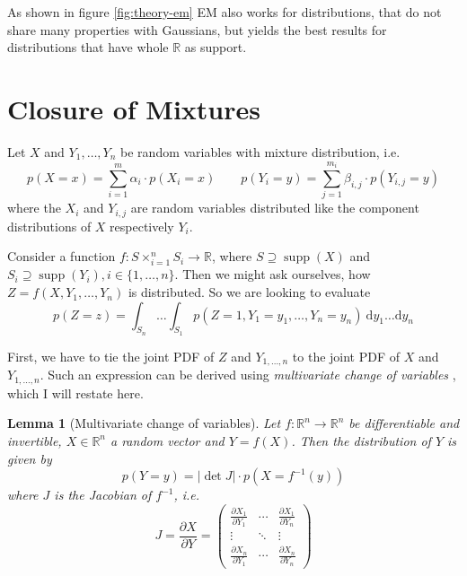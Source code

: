 \documentclass[11pt,a4paper]{book}
\newtheorem{lemma}{Lemma}
\DeclareMathOperator{\supp}{supp}
\begin{document}
As shown in figure \ref{fig:theory-em} EM also works for distributions, that do
not share many properties with Gaussians, but yields the best results for
distributions that have whole $\mathbb{R}$ as support.

\section{Closure of Mixtures}
\label{sec:closure}

Let $X$ and $Y_{1}, \dots, Y_{n}$ be random variables with mixture distribution,
i.e.
\begin{equation*}
  p(X = x) = \sum_{i = 1}^{m} \alpha_{i} \cdot p(X_{i} = x) \qquad p(Y_{i} = y) = \sum_{j = 1}^{m_{i}} \beta_{i,j} \cdot p(Y_{i,j} = y)
\end{equation*}
where the $X_{i}$ and $Y_{i, j}$ are random variables distributed like the
component distributions of $X$ respectively $Y_{i}$.

Consider a function $f : S \times_{i = 1}^{n} S_{i} \rightarrow \mathbb{R}$,
where $S \supseteq \supp(X)$ and
$S_{i} \supseteq \supp(Y_{i}), i \in \{ 1, \dots, n \}$. Then we might ask
ourselves, how $Z = f(X, Y_{1}, \dots, Y_{n})$ is distributed. So we are looking
to evaluate
\begin{equation*}
  p(Z = z) = \int_{S_{n}}\dots\int_{S_{1}} p(Z = 1, Y_{1} = y_{1}, \dots, Y_{n} = y_{n})~\mathrm{d}y_{1}\dots\mathrm{d}y_{n}
\end{equation*}

First, we have to tie the joint PDF of $Z$ and $Y_{1, \dots, n}$ to the joint
PDF of $X$ and $Y_{1, \dots, n}$. Such an expression can be derived using
\emph{multivariate change of variables} \cite[chapter~2.6.2.1]{murphy}, which I
will restate here.

\begin{lemma}[Multivariate change of variables]
  \label{lemma:multivariate-change}
  Let $f : \mathbb{R}^{n} \rightarrow \mathbb{R}^{n}$ be differentiable and
  invertible, $X \in \mathbb{R}^{n}$ a random vector and $Y = f(X)$. Then the
  distribution of $Y$ is given by
  \begin{equation*}
    p(Y = y) = \left| \det J \right| \cdot p(X = f^{-1}(y))
  \end{equation*}
  where $J$ is the Jacobian of $f^{-1}$, i.e.
  \begin{equation*}
    J = \frac{\partial X}{\partial Y} = \begin{pmatrix}
      \frac{\partial X_{1}}{\partial Y_{1}} & \cdots & \frac{\partial X_{1}}{\partial Y_{n}}\\
      \vdots & \ddots & \vdots\\
      \frac{\partial X_{n}}{\partial Y_{1}} & \cdots & \frac{\partial X_{n}}{\partial Y_{n}}
    \end{pmatrix}
  \end{equation*}
\end{lemma}
\end{document}

